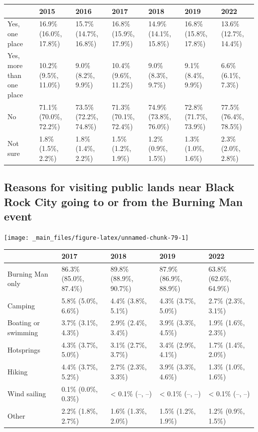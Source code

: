\documentclass[
]{book}
\begin{document}
\begin{table}
\centering
\begin{tabular}[t]{>{}l|>{}l|>{}l|>{}l|>{}l|>{}l|>{}l}
\hline
  & 2015 & 2016 & 2017 & 2018 & 2019 & 2022\\
\hline
Yes, one place & 16.9\% (16.0\%, 17.8\%) & 15.7\% (14.7\%, 16.8\%) & 16.8\% (15.9\%, 17.9\%) & 14.9\% (14.1\%, 15.8\%) & 16.8\% (15.8\%, 17.8\%) & 13.6\% (12.7\%, 14.4\%)\\
\hline
Yes, more than one place & 10.2\% (9.5\%, 11.0\%) & 9.0\% (8.2\%, 9.9\%) & 10.4\% (9.6\%, 11.2\%) & 9.0\% (8.3\%, 9.7\%) & 9.1\% (8.4\%, 9.9\%) & 6.6\% (6.1\%, 7.3\%)\\
\hline
No & 71.1\% (70.0\%, 72.2\%) & 73.5\% (72.2\%, 74.8\%) & 71.3\% (70.1\%, 72.4\%) & 74.9\% (73.8\%, 76.0\%) & 72.8\% (71.7\%, 73.9\%) & 77.5\% (76.4\%, 78.5\%)\\
\hline
Not sure & 1.8\% (1.5\%, 2.2\%) & 1.8\% (1.4\%, 2.2\%) & 1.5\% (1.2\%, 1.9\%) & 1.2\% (0.9\%, 1.5\%) & 1.3\% (1.0\%, 1.6\%) & 2.3\% (2.0\%, 2.8\%)\\
\hline
\end{tabular}
\end{table}

\hypertarget{reasons-for-visiting-public-lands-near-black-rock-city-going-to-or-from-the-burning-man-event}{%
\subsection{Reasons for visiting public lands near Black Rock City going to or from the Burning Man event}\label{reasons-for-visiting-public-lands-near-black-rock-city-going-to-or-from-the-burning-man-event}}

\texttt{[image: \_main\_files/figure-latex/unnamed-chunk-79-1]}

\begin{table}
\centering
\begin{tabular}[t]{>{}l|>{}l|>{}l|>{}l|>{}l}
\hline
  & 2017 & 2018 & 2019 & 2022\\
\hline
Burning Man only & 86.3\% (85.0\%, 87.4\%) & 89.8\% (88.9\%, 90.7\%) & 87.9\% (86.9\%, 88.9\%) & 63.8\% (62.6\%, 64.9\%)\\
\hline
Camping & 5.8\% (5.0\%, 6.6\%) & 4.4\% (3.8\%, 5.1\%) & 4.3\% (3.7\%, 5.0\%) & 2.7\% (2.3\%, 3.1\%)\\
\hline
Boating or swimming & 3.7\% (3.1\%, 4.3\%) & 2.9\% (2.4\%, 3.4\%) & 3.9\% (3.3\%, 4.5\%) & 1.9\% (1.6\%, 2.3\%)\\
\hline
Hotsprings & 4.3\% (3.7\%, 5.0\%) & 3.1\% (2.7\%, 3.7\%) & 3.4\% (2.9\%, 4.1\%) & 1.7\% (1.4\%, 2.0\%)\\
\hline
Hiking & 4.4\% (3.7\%, 5.2\%) & 2.7\% (2.3\%, 3.3\%) & 3.9\% (3.3\%, 4.6\%) & 1.3\% (1.0\%, 1.6\%)\\
\hline
Wind sailing & 0.1\% (0.0\%, 0.3\%) & < 0.1\% (--, --) & < 0.1\% (--, --) & < 0.1\% (--, --)\\
\hline
Other & 2.2\% (1.8\%, 2.7\%) & 1.6\% (1.3\%, 2.0\%) & 1.5\% (1.2\%, 1.9\%) & 1.2\% (0.9\%, 1.5\%)\\
\hline
\end{tabular}
\end{table}
\end{document}
